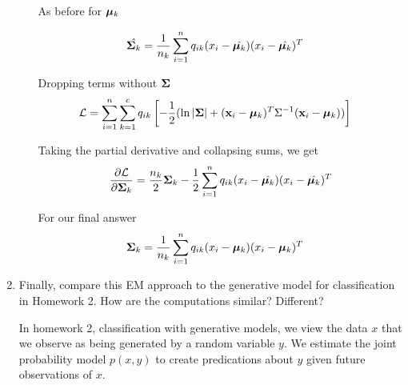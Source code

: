 \documentclass[submit]{harvardml}
\newenvironment{answer}{%
\color{answergreen}\sffamily\large}{}
\newcommand{\bx}{\mathbf{x}} %
\begin{document}
\begin{enumerate}
\begin{itemize}
                As before for $\boldsymbol{\mu}_k$

                \begin{answer}
                    \begin{align}
                        \hat{\mathbf{\Sigma}_k} &= \frac{1}{n_k} \sum_{i=1}^n  q_{ik} (x_i-\hat{\boldsymbol{\mu}_k})(x_i-\hat{\boldsymbol{\mu}_k})^T
                    \end{align}

                    Dropping terms without $\mathbf{\Sigma}$
                    \begin{align}
                        \mathcal{L} &= \sum_{i=1}^n \sum_{k=1}^c q_{ik} \left[ 
                            -\frac{1}{2} ( \ln|\bSigma|+(\bx_i-\bmu_k)^T\Sigma^{-1} (\bx_i-\bmu_k) )
                        \right] 
                    \end{align}


                    Taking the partial derivative and collapsing sums, we get 
                    \begin{align}
                        \frac{\partial \mathcal{L}}{\partial \mathbf{\Sigma}_k} &=  
                        \frac{n_k}{2}\mathbf{\Sigma}_k - \frac{1}{2}\sum_{i=1}^n 
                        q_{ik} (x_i-\hat{\boldsymbol{\mu}_k})(x_i-\hat{\boldsymbol{\mu}_k})^T \\
                    \end{align}

                    For our final answer
                    \begin{align}
                        \mathbf{\Sigma}_k &= \frac{1}{n_k} \sum_{i=1}^n  q_{ik} (x_i-\boldsymbol{\mu}_k)(x_i-\boldsymbol{\mu}_k)^T
                    \end{align}
                \end{answer}
        \end{itemize}

	\item Finally, compare this EM approach to the generative model for classification in Homework
		2.  How are the computations similar?  Different? 

		\begin{answer}

            In homework 2, classification with generative models, we view the data $x$ that we
            observe as being generated by a random variable $y$. We estimate the joint probability
            model $p(x,y)$ to create predications about $y$ given future observations of $x$.


\end{answer}
\end{enumerate}
\end{document}
